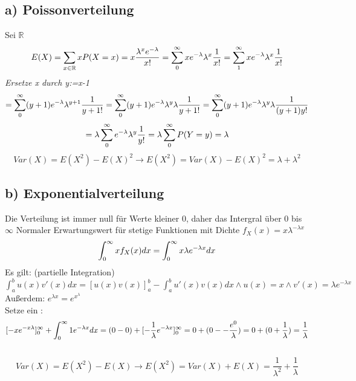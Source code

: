 \documentclass[11pt]{article} %
\begin{document}
{\subsection*{a) Poissonverteilung}
Sei $\mathbb{R}$   
$$ E(X) =
\sum_{x \in \mathbb{R} } x P(X = x) \\
= x \frac{ \lambda^x e^{-\lambda}}{x!} \\
= \sum_{0}^{\infty} x e^{-\lambda} \lambda^x \frac{1}{x!} \\
= \sum_{1}^{\infty} x e^{-\lambda} \lambda^x \frac{1}{x!} \\
$$
 \textit{Ersetze x durch y:=x-1 }
$$
= \sum_{0}^{\infty} (y+1) e^{-\lambda} \lambda^{y+1} \frac{1}{y+1!} \\
= \sum_{0}^{\infty} (y+1) e^{-\lambda} \lambda^{y} \lambda \frac{1}{y+1!} \\
= \sum_{0}^{\infty} (y+1) e^{-\lambda} \lambda^{y} \lambda \frac{1}{(y+1) y!} \\ $$
$$
= \lambda \sum_{0}^{\infty}  e^{-\lambda} \lambda^{y}  \frac{1}{y!} = \lambda \sum_{0}^{\infty} P(Y=y)  \\
= \lambda	
$$
\noindent\makebox[\linewidth]{\rule{\textwidth}{0.4pt}}
$$ Var(X)= E(X^2) -E(X)^2 
\rightarrow  E(X^2) = Var (X) - E(X)^2 = \lambda + \lambda^2 $$

\subsection*{b) Exponentialverteilung}
Die Verteilung ist immer null für Werte kleiner 0, daher das Intergral über 0 bis $\infty$
Normaler Erwartungswert für stetige Funktionen mit Dichte $f_X(x) =x \lambda ^{-\lambda x}  $
$$ 
\int_{0}^{\infty}  x f_X(x) dx \\
= \int_{0}^{\infty} x \lambda  e^{-\lambda x} dx \\
$$
Es gilt: (partielle Integration)\\
$\int_a^b u(x)v'(x) dx = [ u(x) v(x) ]_a^b - \int_a^b u' (x) v(x) dx  \land u(x) = x \land v'(x) = \lambda e^{-\lambda x} $\\
Außerdem: $e^{\lambda x} = e ^ {x ^ \lambda} $\\
Setze ein :
$$
[-x  e^{-x \lambda} ]_0^\infty + \int_{0}^{\infty} 1 e^{-\lambda x} dx \\
=(0 - 0) + [ - \frac{1}{\lambda} e^{-\lambda x} ]_0^\infty \\
= 0 + ( 0 -  -\frac{e^0}{\lambda}  )
= 0 + ( 0 + \frac{1}{\lambda}) \\
= \frac{1}{\lambda}
$$\\
\noindent\makebox[\linewidth]{\rule{\textwidth}{0.4pt}}
$$Var(X) = E(X^2) -E(X) \rightarrow E(X^2) = Var(X) +E(X)  = \frac{1}{\lambda^2} + \frac{1}{\lambda}  $$


}
\end{document}
